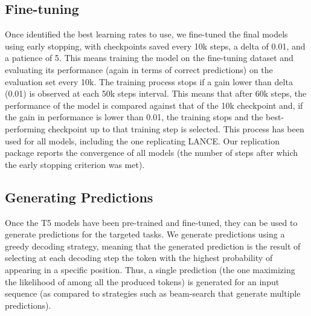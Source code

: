 \subsection{Fine-tuning}
Once identified the best learning rates to use, we fine-tuned the final models using early stopping, with checkpoints saved every 10k steps, a delta of 0.01, and a patience of 5. This means training the model on the fine-tuning dataset and evaluating its performance (again in terms of correct predictions) on the evaluation set every 10k. The training process stops if a gain lower than delta (0.01) is observed at each  50k steps interval. This means that after 60k steps, the performance of the model is compared against that of the 10k checkpoint and, if the gain in performance is lower than 0.01, the training stops and the best-performing checkpoint up to that training step is selected. This process has been used for all models, including the one replicating LANCE. Our replication package \cite{replication} reports the convergence of all models (\ie the number of steps after which the early stopping criterion was met). 


\subsection{Generating Predictions}
Once the T5 models have been pre-trained and fine-tuned, they can be used to generate predictions for the targeted tasks. We generate predictions using a greedy decoding strategy, meaning that the generated prediction is the result of selecting at each decoding step the token with the highest probability of appearing in a specific position. Thus, a single prediction (\ie the one maximizing the likelihood of among all the produced tokens) is generated for an input sequence (as compared to strategies such as beam-search\cite{freitag2017beam} that generate multiple predictions).
